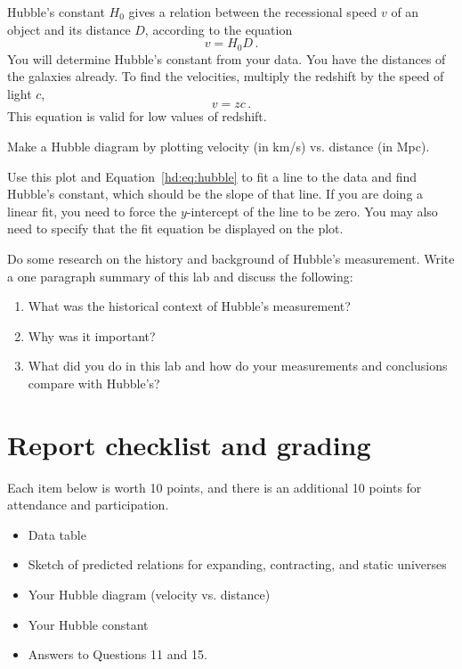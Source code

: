 Hubble's constant $H_0$ gives a relation between the recessional speed $v$ of an object and its distance $D$, according to the equation
\begin{equation}\label{hd:eq:hubble}
 v = H_0 D \,.
\end{equation}
You will determine Hubble's constant from your data. You have the distances of the galaxies already. To find the velocities, multiply the redshift by the speed of light $c$,
\begin{equation}
 v = zc \,.
\end{equation}
This equation is valid for low values of redshift.

\begin{steps}
	
	\item Make a Hubble diagram by plotting velocity (in km/s) vs. distance (in Mpc).
	
	\item Use this plot and Equation~\ref{hd:eq:hubble} to fit a line to the data and find Hubble's constant, which should be the slope of that line. If you are doing a linear fit, you need to force the $y$-intercept of the line to be zero. You may also need to specify that the fit equation be displayed on the plot.
	
	\item Do some research on the history and background of Hubble’s
	measurement. Write a one paragraph summary of this lab and discuss
	the following:
	\begin{enumerate}
		\item What was the historical context of Hubble’s measurement?
		\item Why was it important?
		\item What did you do in this lab and how do your measurements and
		conclusions compare with Hubble’s?
	\end{enumerate}
\end{steps}

\section{Report checklist and grading}

Each item below is worth 10 points, and there is an additional 10 points for attendance and participation.

\begin{itemize}
	\item Data table
	
	\item Sketch of predicted relations for expanding, contracting, and static universes
	
	\item Your Hubble diagram (velocity vs. distance)
	
	\item Your Hubble constant
	
	\item Answers to Questions 11 and 15.
\end{itemize}